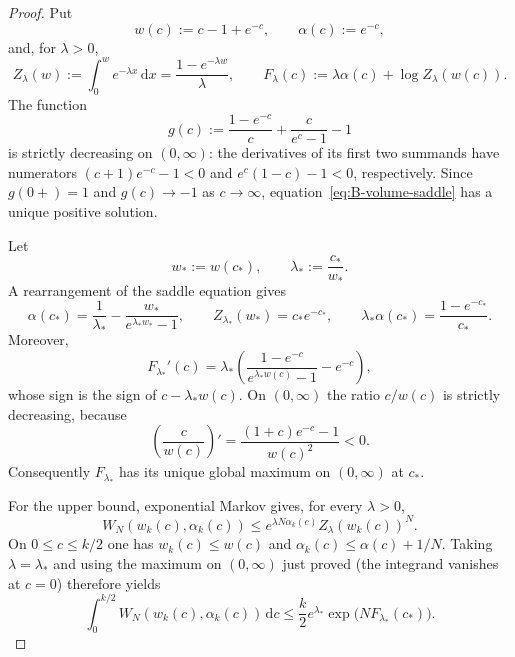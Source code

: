 \documentclass[10pt,a4paper]{amsart}
\begin{document}
\begin{proof}
Put
\[
 w(c):=c-1+e^{-c},\qquad \alpha(c):=e^{-c},
\]
and, for $\lambda>0$,
\[
 Z_\lambda(w):=\int_0^w e^{-\lambda x}\,\mathrm d x
 =\frac{1-e^{-\lambda w}}{\lambda},\qquad
 F_\lambda(c):=\lambda\alpha(c)+\log Z_\lambda(w(c)).
\]
The function
\[
 g(c):=\frac{1-e^{-c}}c+\frac c{e^c-1}-1
\]
is strictly decreasing on $(0,\infty)$: the derivatives of its first two
summands have numerators $(c+1)e^{-c}-1<0$ and
$e^c(1-c)-1<0$, respectively.  Since $g(0+)=1$ and
$g(c)\to-1$ as $c\to\infty$, equation~\eqref{eq:B-volume-saddle} has a
unique positive solution.

Let
\[
 w_*:=w(c_*),\qquad \lambda_*:=\frac{c_*}{w_*}.
\]
A rearrangement of the saddle equation gives
\begin{equation}\label{eq:B-volume-saddle-identities}
 \alpha(c_*)=
 \frac1{\lambda_*}-\frac{w_*}{e^{\lambda_*w_*}-1},\qquad
 Z_{\lambda_*}(w_*)=c_*e^{-c_*},\qquad
 \lambda_*\alpha(c_*)=\frac{1-e^{-c_*}}{c_*}.
\end{equation}
Moreover,
\[
 F_{\lambda_*}'(c)
 =\lambda_*\left(
   \frac{1-e^{-c}}{e^{\lambda_*w(c)}-1}-e^{-c}\right),
\]
whose sign is the sign of $c-\lambda_*w(c)$.  On $(0,\infty)$ the ratio
$c/w(c)$ is strictly decreasing, because
\[
 \left(\frac c{w(c)}\right)'
 =\frac{(1+c)e^{-c}-1}{w(c)^2}<0.
\]
Consequently $F_{\lambda_*}$ has its unique global maximum on
$(0,\infty)$ at $c_*$.

For the upper bound, exponential Markov gives, for every $\lambda>0$,
\[
 W_N(w_k(c),\alpha_k(c))
 \le e^{\lambda N\alpha_k(c)}Z_\lambda(w_k(c))^N.
\]
On $0\le c\le k/2$ one has $w_k(c)\le w(c)$ and
$\alpha_k(c)\le\alpha(c)+1/N$.  Taking $\lambda=\lambda_*$ and using the
maximum on $(0,\infty)$ just proved (the integrand vanishes at $c=0$)
therefore yields
\[
 \int_0^{k/2}W_N(w_k(c),\alpha_k(c))\,\mathrm d c
 \le \frac{k}{2}e^{\lambda_*}
     \exp\bigl(NF_{\lambda_*}(c_*)\bigr).
\]


\end{proof}
\end{document}
